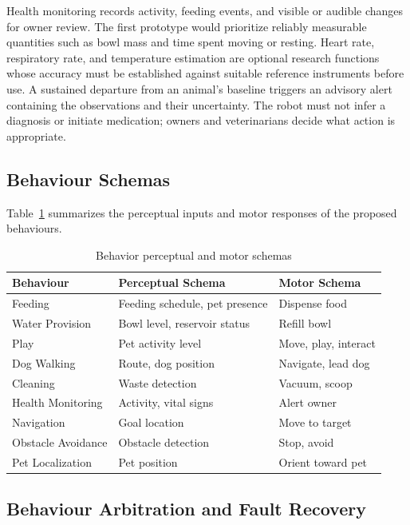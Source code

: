 \documentclass[conference,letterpaper]{IEEEtran}
\begin{document}
Health monitoring records activity, feeding events, and visible or audible changes for owner review. The first prototype would prioritize reliably measurable quantities such as bowl mass and time spent moving or resting. Heart rate, respiratory rate, and temperature estimation are optional research functions whose accuracy must be established against suitable reference instruments before use. A sustained departure from an animal's baseline triggers an advisory alert containing the observations and their uncertainty. The robot must not infer a diagnosis or initiate medication; owners and veterinarians decide what action is appropriate.

\subsection{Behaviour Schemas}

Table~\ref{tab:behaviors} summarizes the perceptual inputs and motor responses of the proposed behaviours.

\begin{table}[!htbp]\caption{Behavior perceptual and motor schemas}\label{tab:behaviors}\centering\footnotesize\renewcommand{\arraystretch}{1.15}\begin{tabularx}{\columnwidth}{@{}p{}XX@{}}\toprule
Behaviour & Perceptual Schema & Motor Schema \\\midrule
Feeding & Feeding schedule, pet presence & Dispense food \\
Water Provision & Bowl level, reservoir status & Refill bowl \\
Play & Pet activity level & Move, play, interact \\
Dog Walking & Route, dog position & Navigate, lead dog \\
Cleaning & Waste detection & Vacuum, scoop \\
Health Monitoring & Activity, vital signs & Alert owner \\
Navigation & Goal location & Move to target \\
Obstacle Avoidance & Obstacle detection & Stop, avoid \\
Pet Localization & Pet position & Orient toward pet \\
\bottomrule\end{tabularx}\end{table}

\subsection{Behaviour Arbitration and Fault Recovery}
\end{document}
